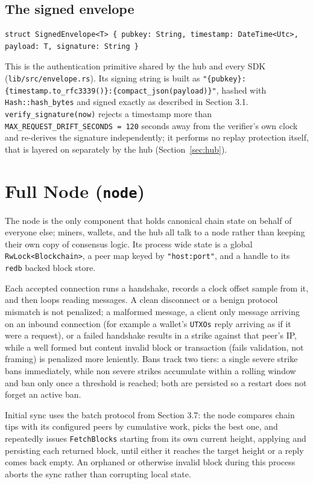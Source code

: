 \documentclass[11pt]{article}
\newcommand{\code}[1]{\texttt{#1}}
\begin{document}
\subsection{The signed envelope}
\label{sec:envelope}

\begin{lstlisting}
struct SignedEnvelope<T> { pubkey: String, timestamp: DateTime<Utc>, payload: T, signature: String }
\end{lstlisting}

This is the authentication primitive shared by the hub and every SDK (\code{lib/src/envelope.rs}). Its signing string is built as \code{"\{pubkey\}:\{timestamp.to\_rfc3339()\}:\{compact\_json(payload)\}"}, hashed with \code{Hash::hash\_bytes} and signed exactly as described in Section 3.1. \code{verify\_signature(now)} rejects a timestamp more than \code{MAX\_REQUEST\_DRIFT\_SECONDS = 120} seconds away from the verifier's own clock and re-derives the signature independently; it performs no replay protection itself, that is layered on separately by the hub (Section~\ref{sec:hub}).

\section{Full Node (\code{node})}
\label{sec:node}

The node is the only component that holds canonical chain state on behalf of everyone else; miners, wallets, and the hub all talk to a node rather than keeping their own copy of consensus logic. Its process wide state is a global \code{RwLock<Blockchain>}, a peer map keyed by \code{"host:port"}, and a handle to its \code{redb} backed block store.

Each accepted connection runs a handshake, records a clock offset sample from it, and then loops reading messages. A clean disconnect or a benign protocol mismatch is not penalized; a malformed message, a client only message arriving on an inbound connection (for example a wallet's \code{UTXOs} reply arriving as if it were a request), or a failed handshake results in a strike against that peer's IP, while a well formed but content invalid block or transaction (fails validation, not framing) is penalized more leniently. Bans track two tiers: a single severe strike bans immediately, while non severe strikes accumulate within a rolling window and ban only once a threshold is reached; both are persisted so a restart does not forget an active ban.

Initial sync uses the batch protocol from Section 3.7: the node compares chain tips with its configured peers by cumulative work, picks the best one, and repeatedly issues \code{FetchBlocks} starting from its own current height, applying and persisting each returned block, until either it reaches the target height or a reply comes back empty. An orphaned or otherwise invalid block during this process aborts the sync rather than corrupting local state.
\end{document}
